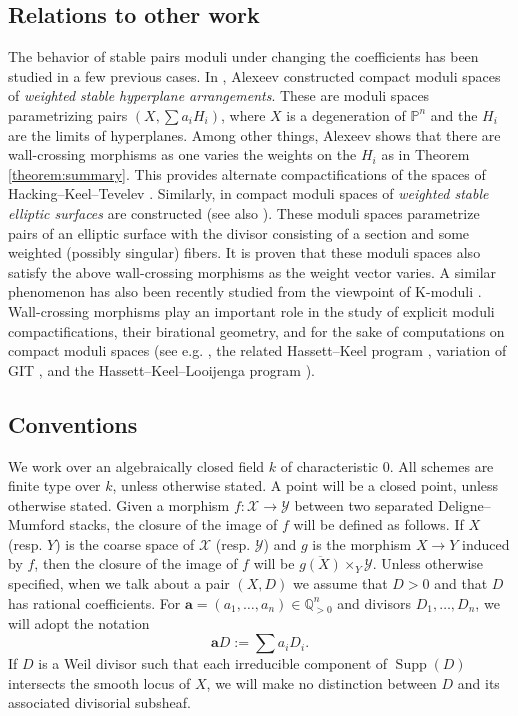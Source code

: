 \documentclass[11pt]{amsart}
\theoremstyle{definition}
\theoremstyle{remark}
\newcommand{\bP}{{\mathbb P}}
\newcommand{\bQ}{{\mathbb Q}}
\newcommand{\calX}{\mathcal X}
\newcommand{\calY}{\mathcal Y}
\newcommand{\Supp}{\operatorname{Supp}}
\begin{document}
	\subsection{Relations to other work}   The behavior of stable pairs moduli under changing the coefficients has been studied in a few previous cases. In \cite{Ale15}, Alexeev constructed compact moduli spaces of \emph{weighted stable hyperplane arrangements}. These are moduli spaces parametrizing pairs $(X, \sum a_i H_i)$, where $X$ is a
	degeneration of $\bP^n$ and the $H_i$ are the limits of hyperplanes. Among other things, Alexeev shows that there are wall-crossing morphisms as one varies the weights on the $H_i$ as in Theorem \ref{theorem:summary}. This provides alternate compactifications of the spaces of Hacking--Keel--Tevelev \cite{hkt}. Similarly, in \cite{AB17} compact moduli spaces of \emph{weighted stable elliptic surfaces} are constructed (see also \cite{Inc18}). These moduli spaces parametrize pairs of an elliptic surface with the divisor consisting of a section and some weighted (possibly singular) fibers. It is proven that these moduli spaces also satisfy the above wall-crossing morphisms as the weight vector varies. A similar phenomenon has also been recently studied from the viewpoint of K-moduli \cite{ADL}.
	Wall-crossing morphisms play an important role in the study of explicit moduli compactifications, their birational geometry, and for the sake of computations on compact moduli spaces (see e.g. \cite{k3,dp}, the related Hassett--Keel program \cite{fedorchukalternate}, variation of GIT \cite{dhu, thaddeus}, and the Hassett--Keel--Looijenga program \cite{LO, LO2, LO3, ADL2}).
	
	
	
	
	
	
	\subsection*{Conventions}We work over an algebraically closed field $k$ of characteristic 0. All schemes are finite type over $k$, unless otherwise stated. A point will be a closed point, unless otherwise stated.
	Given a morphism $f:\calX \to \calY$ between two separated Deligne--Mumford stacks, the closure of the image of $f$ will be defined as follows. If $X$ (resp. $Y$) is the coarse space of $\calX$ (resp. $\calY$) and $g$ is the morphism $X \to Y$ induced by $f$, then the closure of the image of $f$ will be $\overline{g(X)} \times_Y \calY$. Unless otherwise specified, when we talk about a pair $(X,D)$ we assume that $D>0$ and that $D$ has rational coefficients.
	For $\mathbf{a} = (a_1, \ldots, a_n) \in \bQ^n_{> 0}$ and divisors $D_1, \ldots, D_n$, we will adopt the notation
	$$
	\mathbf{a}D := \sum a_iD_i.
	$$
	If $D$ is a Weil divisor such that each irreducible component of $\Supp(D)$ intersects the smooth locus of $X$, we will make no distinction between $D$ and its associated divisorial subsheaf. 
	
\end{document}
